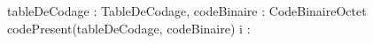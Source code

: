 \begin{algorithme}
        {tableDeCodage : TableDeCodage, codeBinaire : CodeBinaire}{Octet}
        {codePresent(tableDeCodage, codeBinaire)}
        {i : \naturelNonNul}
    {
    }


\end{algorithme}
